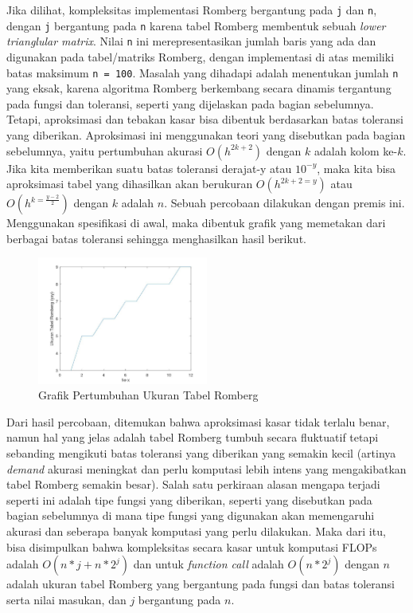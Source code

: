 \documentclass[journal,12pt,onecolumn,a4paper]{IEEEtran}
\begin{document}
Jika dilihat, kompleksitas implementasi Romberg bergantung pada \lstinline{j} dan \lstinline{n}, dengan \lstinline{j} bergantung pada \lstinline{n} karena tabel Romberg membentuk sebuah \emph{lower trianglular matrix}. Nilai \lstinline{n} ini merepresentasikan jumlah baris yang ada dan digunakan pada tabel/matriks Romberg, dengan implementasi di atas memiliki batas maksimum \lstinline{n = 100}.
Masalah yang dihadapi adalah menentukan jumlah \lstinline{n} yang eksak, karena algoritma Romberg berkembang secara dinamis tergantung pada fungsi dan toleransi, seperti yang dijelaskan pada bagian sebelumnya. Tetapi, aproksimasi dan tebakan kasar bisa dibentuk berdasarkan batas toleransi yang diberikan. Aproksimasi ini menggunakan teori yang disebutkan pada bagian sebelumnya, yaitu pertumbuhan akurasi \(O(h^{2k+2})\) dengan \(k\) adalah kolom ke-\(k\).
Jika kita memberikan suatu batas toleransi derajat-y atau \(10^{-y}\), maka kita bisa aproksimasi tabel yang dihasilkan akan berukuran \(O(h^{2k+2 = y})\) atau \(O(h^{k=\frac{y-2}{2}})\) dengan \(k\) adalah \(n\).
Sebuah percobaan dilakukan dengan premis ini. Menggunakan spesifikasi di awal, maka dibentuk grafik yang memetakan dari berbagai batas toleransi sehingga menghasilkan hasil berikut.

\begin{figure}[h]
	\centering
	\includegraphics[width=0.5\textwidth]{rombergSize}
	\caption{Grafik Pertumbuhan Ukuran Tabel Romberg}
	\label{fig:rombergTableGraph}
\end{figure}
Dari hasil percobaan, ditemukan bahwa aproksimasi kasar tidak terlalu benar, namun hal yang jelas adalah tabel Romberg tumbuh secara fluktuatif tetapi sebanding mengikuti batas toleransi yang diberikan yang semakin kecil (artinya \emph{demand} akurasi meningkat dan perlu komputasi lebih intens yang mengakibatkan tabel Romberg semakin besar).
Salah satu perkiraan alasan mengapa terjadi seperti ini adalah tipe fungsi yang diberikan, seperti yang disebutkan pada bagian sebelumnya di mana tipe fungsi yang digunakan akan memengaruhi akurasi dan seberapa banyak komputasi yang perlu dilakukan.
Maka dari itu, bisa disimpulkan bahwa kompleksitas secara kasar untuk komputasi FLOPs adalah \(O(n*j + n*2^j)\) dan untuk \emph{function call} adalah \(O(n*2^j)\) dengan \(n\) adalah ukuran tabel Romberg yang bergantung pada fungsi dan batas toleransi serta nilai masukan, dan \(j\) bergantung pada \(n\).
\end{document}
